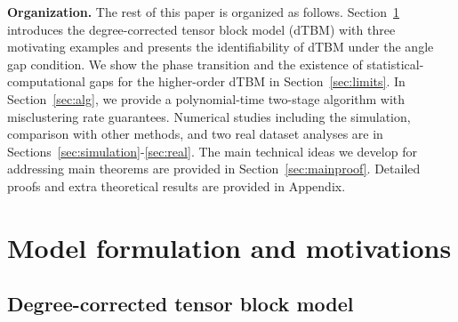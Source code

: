 \documentclass[lettersize,onecolumn,journal]{IEEEtran}
\theoremstyle{definition}
\theoremstyle{definition}
\begin{document}
{\bf Organization.} The rest of this paper is organized as follows. Section~\ref{sec:model} introduces the degree-corrected tensor block model (dTBM) with three motivating examples and presents the identifiability of dTBM under the angle gap condition. We show the phase transition and the existence of statistical-computational gaps for the higher-order dTBM in Section~\ref{sec:limits}. In Section~\ref{sec:alg}, we provide a polynomial-time two-stage algorithm with misclustering rate guarantees. Numerical studies including the simulation, comparison with other methods, and two real dataset analyses are in Sections~\ref{sec:simulation}-\ref{sec:real}. The main technical ideas we develop for addressing main theorems are provided in Section~\ref{sec:mainproof}. Detailed proofs and extra theoretical results are provided in Appendix.


\section{Model formulation and motivations}\label{sec:model}

\subsection{Degree-corrected tensor block model}
\end{document}
